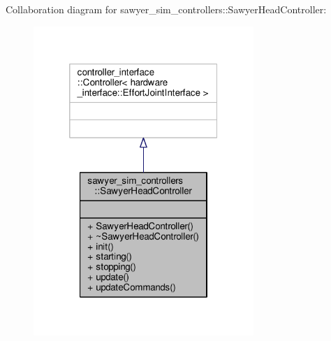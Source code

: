 Collaboration diagram for sawyer\-\_\-sim\-\_\-controllers\-:\-:Sawyer\-Head\-Controller\-:\nopagebreak
\begin{figure}[H]
\begin{center}
\leavevmode
\includegraphics[width=236pt]{classsawyer__sim__controllers_1_1_sawyer_head_controller__coll__graph}
\end{center}
\end{figure}
